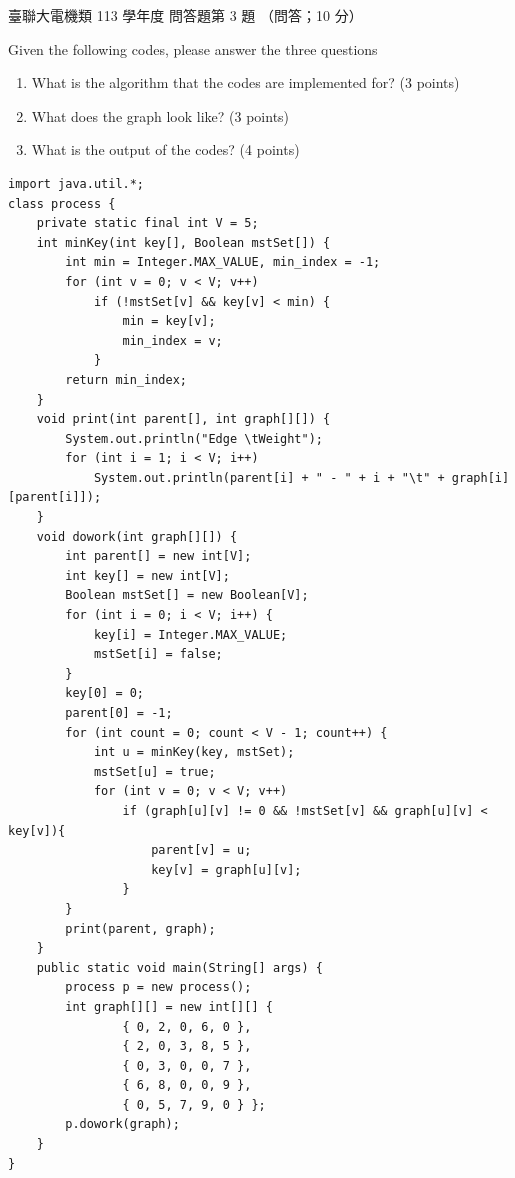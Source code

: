 \begin{pastexam}[label={px:ust-113-ee-ds-19}]{臺聯大電機類 113 學年度 問答題第 3 題}
（問答；10 分）

Given the following codes, please answer the three questions
\begin{enumerate}[label=(\Alph*)]
\item What is the algorithm that the codes are implemented for? (3 points)
\item What does the graph look like? (3 points)
\item What is the output of the codes? (4 points)
\end{enumerate}
\begin{verbatim}
import java.util.*;
class process {
    private static final int V = 5;
    int minKey(int key[], Boolean mstSet[]) {
        int min = Integer.MAX_VALUE, min_index = -1;
        for (int v = 0; v < V; v++)
            if (!mstSet[v] && key[v] < min) {
                min = key[v];
                min_index = v;
            }
        return min_index;
    }
    void print(int parent[], int graph[][]) {
        System.out.println("Edge \tWeight");
        for (int i = 1; i < V; i++)
            System.out.println(parent[i] + " - " + i + "\t" + graph[i][parent[i]]);
    }
    void dowork(int graph[][]) {
        int parent[] = new int[V];
        int key[] = new int[V];
        Boolean mstSet[] = new Boolean[V];
        for (int i = 0; i < V; i++) {
            key[i] = Integer.MAX_VALUE;
            mstSet[i] = false;
        }
        key[0] = 0;
        parent[0] = -1;
        for (int count = 0; count < V - 1; count++) {
            int u = minKey(key, mstSet);
            mstSet[u] = true;
            for (int v = 0; v < V; v++)
                if (graph[u][v] != 0 && !mstSet[v] && graph[u][v] < key[v]){
                    parent[v] = u;
                    key[v] = graph[u][v];
                }
        }
        print(parent, graph);
    }
    public static void main(String[] args) {
        process p = new process();
        int graph[][] = new int[][] {
                { 0, 2, 0, 6, 0 },
                { 2, 0, 3, 8, 5 },
                { 0, 3, 0, 0, 7 },
                { 6, 8, 0, 0, 9 },
                { 0, 5, 7, 9, 0 } };
        p.dowork(graph);
    }
}
\end{verbatim}
\end{pastexam}

